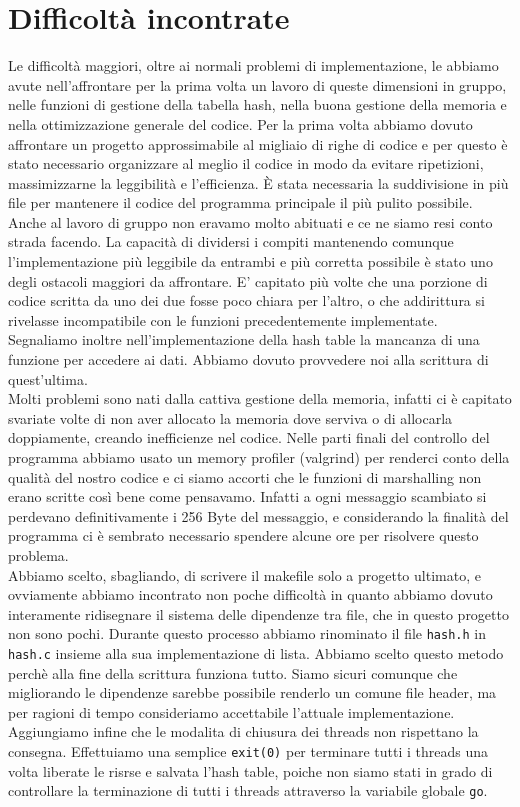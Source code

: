\documentclass[a4paper, 11pt]{article} %
\begin{document}
\section*{Difficoltà incontrate}
Le difficoltà maggiori, oltre ai normali problemi di implementazione, le abbiamo avute nell'affrontare per la prima volta un lavoro di queste dimensioni in gruppo, nelle funzioni di gestione della tabella hash, nella buona gestione della memoria e nella ottimizzazione generale del codice.
Per la prima volta abbiamo dovuto affrontare un progetto approssimabile al migliaio di righe di codice e per questo è stato necessario organizzare al meglio il codice in modo da evitare ripetizioni, massimizzarne la leggibilità e l'efficienza. È stata necessaria la suddivisione in più file per mantenere il codice del programma principale il più pulito possibile.\\
Anche al lavoro di gruppo non eravamo molto abituati e ce ne siamo resi conto strada facendo. La capacità di dividersi i compiti mantenendo comunque l'implementazione più leggibile da entrambi e più corretta possibile è stato uno degli ostacoli maggiori da affrontare. E' capitato più volte che una porzione di codice scritta da uno dei due fosse poco chiara per l'altro, o che addirittura si rivelasse incompatibile con le funzioni precedentemente implementate.\\
Segnaliamo inoltre nell'implementazione della hash table la mancanza di una funzione per accedere ai dati. Abbiamo dovuto provvedere noi alla scrittura di quest'ultima.\\
Molti problemi sono nati dalla cattiva gestione della memoria, infatti ci è capitato svariate volte di non aver allocato la memoria dove serviva o di allocarla doppiamente, creando inefficienze nel codice. Nelle parti finali del controllo del programma abbiamo usato un memory profiler (valgrind) per renderci conto della qualità del nostro codice e ci siamo accorti che le funzioni di marshalling non erano scritte così bene come pensavamo. Infatti a ogni messaggio scambiato si perdevano definitivamente i 256 Byte del messaggio, e considerando la finalità del programma ci è sembrato necessario spendere alcune ore per risolvere questo problema.\\
Abbiamo scelto, sbagliando, di scrivere il makefile solo a progetto ultimato, e ovviamente abbiamo incontrato non poche difficoltà in quanto abbiamo dovuto interamente ridisegnare il sistema delle dipendenze tra file, che in questo progetto non sono pochi. Durante questo processo abbiamo rinominato il file \texttt{hash.h} in \texttt{hash.c} insieme alla sua implementazione di lista. Abbiamo scelto questo metodo perchè alla fine della scrittura funziona tutto. Siamo sicuri comunque che migliorando le dipendenze sarebbe possibile renderlo un comune file header, ma per ragioni di tempo consideriamo accettabile l'attuale implementazione.
Aggiungiamo infine che le modalita di chiusura dei threads non rispettano la consegna. Effettuiamo una semplice \texttt{exit(0)} per terminare tutti i threads una volta liberate le risrse e salvata l'hash table, poiche non siamo stati in grado di controllare la terminazione di tutti i threads attraverso la variabile globale \texttt{go}.\\
\end{document}
